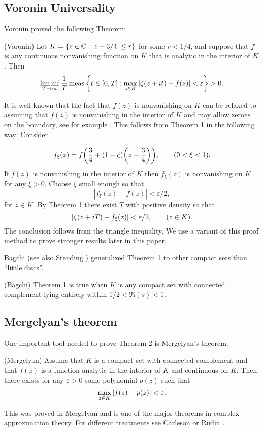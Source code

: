 \documentclass[11pt]{article}
\begin{document}
\subsection{Voronin Universality}

Voronin \cite{Voronin2, Voronin0} proved the following Theorem:
\begin{thm}(Voronin)  Let 
 $K=\{ z \in {\mathbb C} :|z-3/4| \leq r\}$ for some $r<1/4$, and suppose that $f$ is any continuous nonvanishing function on $K$ that is analytic  in the interior of $K$. Then 
$$\liminf_{T \to \infty} \frac 1 T \mathop{\rm meas} \left \{t \in [0,T]:\max_{z \in K} {\left| {\zeta(z+it)-f(z)} \right|}<\varepsilon \right \}>0. $$
\end{thm}


It is well-known that the fact  that $f(z)$ is nonvanishing on $K$ can be relaxed to assuming that $f(z)$ is nonvanishing in the interior of $K$ and may allow zeroes on the boundary, see for example  \cite[p. 251, Theorem 2]{VorKar}. This follows from Theorem 1 in the following way: Consider 

$$f_\xi(z)=f{\left( {\frac 3 4+(1-\xi){\left( {z-\frac 3 4} \right)}} \right)}, \qquad (0<\xi<1).$$  
If $f(z)$ is nonvanishing in the interior of $K$ then $f_\xi(z)$ is nonvanishing on $K$ for any $\xi>0$. Choose $\xi$ small enough so that $$|f_\xi(z)-f(z)|<\varepsilon/2,$$ for $z \in K$. By Theorem 1 there exist $T$ with positive density so that $${\left| {\zeta(z+iT)-f_\xi(z)} \right|}<\varepsilon/2, \qquad (z \in K).$$ The conclusion follows from the triangle inequality. We use a variant of this proof method to prove stronger results later in this paper.


Bagchi \cite{Bagchi}  (see also Steuding \cite[Theorem 1.9]{Steuding}) generalized Theorem 1 to other compact sets than ``little discs''. 
\begin{thm} (Bagchi) Theorem 1 is true when $K$ is any compact set with connected complement lying entirely within $1/2<\Re(s)<1$.
\end{thm}

\subsection{Mergelyan's theorem}

 One important tool needed to prove Theorem 2  is Mergelyan's theorem.
\begin{thm}(Mergelyan) Assume that $K$ is a compact set with connected complement and that $f(z)$ is a function analytic in the interior of $K$ and continuous on $K$. Then there exists for any $\varepsilon>0$ some polynomial $p(z)$ such that
$$
 \max_{z \in K}{\left| {f(z)-p(z)} \right|}<\varepsilon.
$$
\end{thm}
This was proved in Mergelyan \cite{Mergelyan} and is one of the major theorems in complex approximation theory. For different treatments see Carleson \cite{Carleson} or Rudin \cite[Theorem 20.5]{Rudin}.
\end{document}
